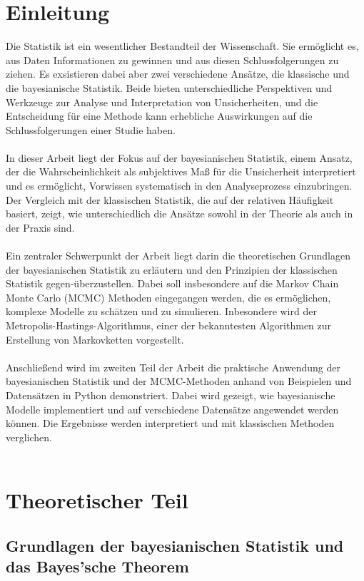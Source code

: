 \documentclass[a4paper,12pt]{article}
\begin{document}
\section{Einleitung}
Die Statistik ist ein wesentlicher Bestandteil der Wissenschaft. Sie ermöglicht es, aus Daten Informationen zu gewinnen und aus diesen Schlussfolgerungen zu ziehen. Es exsistieren dabei aber zwei verschiedene Ansätze, die klassische und die bayesianische Statistik. Beide bieten unterschiedliche Perspektiven und Werkzeuge zur Analyse und Interpretation von Unsicherheiten, und die Entscheidung für eine Methode kann erhebliche Auswirkungen auf die Schlussfolgerungen einer Studie haben.\\\\
In dieser Arbeit liegt der Fokus auf der bayesianischen Statistik, einem Ansatz, der die Wahrscheinlichkeit als subjektives Maß für die Unsicherheit interpretiert und es ermöglicht, Vorwissen systematisch in den Analyseprozess einzubringen. Der Vergleich mit der klassischen Statistik, die auf der relativen Häufigkeit basiert, zeigt, wie unterschiedlich die Ansätze sowohl in der Theorie als auch in der Praxis sind.\\\\
Ein zentraler Schwerpunkt der Arbeit liegt darin die theoretischen Grundlagen der bayesianischen Statistik zu erläutern und den Prinzipien der klassischen Statistik gegen-überzustellen. Dabei soll insbesondere auf die Markov Chain Monte Carlo (MCMC) Methoden eingegangen werden, die es ermöglichen, komplexe Modelle zu schätzen und zu simulieren. Inbesondere wird der Metropolis-Hastings-Algorithmus, einer der bekanntesten Algorithmen zur Erstellung von Markovketten vorgestellt.\\\\
Anschließend wird im zweiten Teil der Arbeit die praktische Anwendung der bayesianischen Statistik und der MCMC-Methoden anhand von Beispielen und Datensätzen in Python demonstriert. Dabei wird gezeigt, wie bayesianische Modelle implementiert und auf verschiedene Datensätze angewendet werden können. Die Ergebnisse werden interpretiert und mit klassischen Methoden verglichen.\\\\
\newpage

\section{Theoretischer Teil}

\subsection{Grundlagen der bayesianischen Statistik und das Bayes'sche Theorem}
\end{document}
